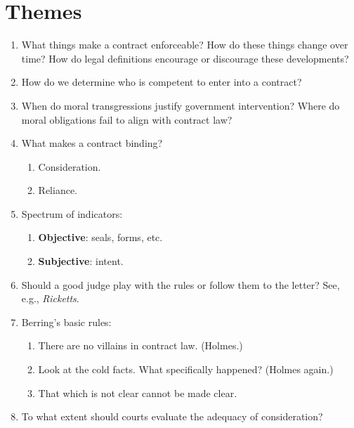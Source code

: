 \section{Themes}

\begin{enumerate}
    \item What things make a contract enforceable? How do these things change 
    over time? How do legal definitions encourage or discourage these 
    developments?
    \item How do we determine who is competent to enter into a contract?
    \item When do moral transgressions justify government intervention? Where 
    do moral obligations fail to align with contract law?
    \item What makes a contract binding?
    \begin{enumerate}
        \item Consideration.
        \item Reliance.
    \end{enumerate}
    \item Spectrum of indicators:
    \begin{enumerate}
        \item \textbf{Objective}: seals, forms, etc.
        \item \textbf{Subjective}: intent.
    \end{enumerate}
    \item Should a good judge play with the rules or follow them to the 
    letter? See, e.g., \emph{Ricketts}.
    \item Berring's basic rules:
    \begin{enumerate}
        \item There are no villains in contract law. (Holmes.)
        \item Look at the cold facts. What specifically happened? (Holmes 
        again.)
        \item That which is not clear cannot be made clear.
    \end{enumerate}
    \item To what extent should courts evaluate the adequacy of consideration?
\end{enumerate}
